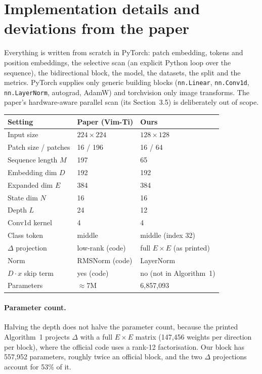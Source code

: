 \documentclass[11pt,a4paper]{article}
\begin{document}
\section{Implementation details and deviations from the paper}

Everything is written from scratch in PyTorch: patch embedding, tokens and position
embeddings, the selective scan (an explicit Python loop over the sequence), the
bidirectional block, the model, the datasets, the split and the metrics. PyTorch
supplies only generic building blocks (\texttt{nn.Linear}, \texttt{nn.Conv1d},
\texttt{nn.LayerNorm}, autograd, AdamW) and torchvision only image transforms.
The paper's hardware-aware parallel scan (its Section~3.5) is deliberately out of
scope.

\begin{center}
\begin{tabular}{lll}
\toprule
Setting & Paper (Vim-Ti) & Ours \\
\midrule
Input size            & $224\times224$ & $128\times128$ \\
Patch size / patches  & 16 / 196 & 16 / 64 \\
Sequence length $M$   & 197 & 65 \\
Embedding dim $D$     & 192 & 192 \\
Expanded dim $E$      & 384 & 384 \\
State dim $N$         & 16 & 16 \\
Depth $L$             & 24 & 12 \\
Conv1d kernel         & 4 & 4 \\
Class token           & middle & middle (index 32) \\
$\Delta$ projection   & low-rank (code) & full $E\times E$ (as printed) \\
Norm                  & RMSNorm (code) & LayerNorm \\
$D\cdot x$ skip term  & yes (code) & no (not in Algorithm~1) \\
Parameters            & $\approx$7M & 6,857,093 \\
\bottomrule
\end{tabular}
\end{center}

\paragraph{Parameter count.} Halving the depth does not halve the parameter count,
because the printed Algorithm~1 projects $\Delta$ with a full $E\times E$ matrix
(147,456 weights per direction per block), where the official code uses a rank-12
factorisation. Our block has 557,952 parameters, roughly twice an official block,
and the two $\Delta$ projections account for 53\% of it.
\end{document}
